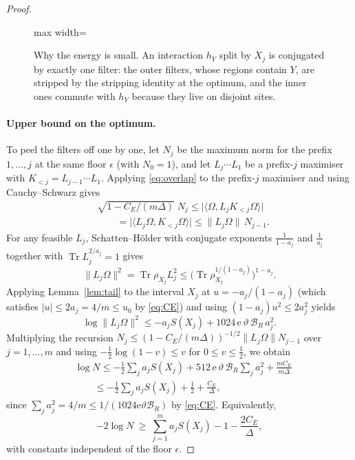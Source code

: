 \documentclass[aps,prx,reprint,superscriptaddress,floatfix,nofootinbib,longbibliography,amsmath,amssymb]{revtex4-2}
\newcommand{\Tr}{\operatorname{Tr}}
\newcommand{\norm}[1]{\lVert #1\rVert}
\newcommand{\abs}[1]{\lvert #1\rvert}
\newcommand{\cB}{\mathcal B}
\newcommand{\Om}{\Omega}
\newcommand{\e}{\mathrm e}
\theoremstyle{plain}
\theoremstyle{definition}
\begin{document}
\begin{proof}
\begin{figure}[t]
\centering
\begin{adjustbox}{max width=\linewidth}

\end{adjustbox}
\caption{Why the energy is small. An interaction $h_Y$ split by $X_j$ is conjugated by exactly one filter: the outer filters, whose regions contain $Y$, are stripped by the stripping identity at the optimum, and the inner ones commute with $h_Y$ because they live on disjoint sites.}\label{fig:qc-single-split}
\end{figure}

\paragraph{Upper bound on the optimum.}
To peel the filters off one by one, let $N_j$ be the maximum norm for the
prefix $1,\dots,j$ at the same floor $\epsilon$ (with $N_0=1$), and let
$L_j\cdots L_1$ be a prefix-$j$ maximiser with $K_{<j}=L_{j-1}\cdots L_1$.
Applying \eqref{eq:overlap} to the prefix-$j$ maximiser and using
Cauchy--Schwarz gives
\[
\begin{split}
 &\sqrt{1-C_E/(m\Delta)}\;N_j\le\abs{\langle\Om,L_jK_{<j}\Om\rangle}\\
 &\qquad=\abs{\langle L_j\Om,K_{<j}\Om\rangle}\le\norm{L_j\Om}\,N_{j-1}.
\end{split}
\]
For any feasible $L_j$, Schatten--Hölder with conjugate exponents
$\frac1{1-a_j}$ and $\frac1{a_j}$ together with $\Tr L_j^{2/a_j}=1$ gives
\[
 \norm{L_j\Om}^2=\Tr\rho_{X_j}L_j^2\le\bigl(\Tr\rho_{X_j}^{1/(1-a_j)}\bigr)^{1-a_j}.
\]
Applying Lemma~\ref{lem:tail} to the interval $X_j$ at
$u=-a_j/(1-a_j)$ (which satisfies $\abs u\le 2a_j=4/m\le u_0$ by
\eqref{eq:CE}) and using $(1-a_j)u^2\le 2a_j^2$ yields
\[
 \log\norm{L_j\Om}^2\le -a_jS(X_j)+1024\,\e\,\vartheta\,\cB_R\,a_j^2 .
\]
Multiplying the recursion $N_j\le(1-C_E/(m\Delta))^{-1/2}\norm{L_j\Om}N_{j-1}$
over $j=1,\dots,m$ and using $-\frac12\log(1-v)\le v$ for $0\le v\le\frac12$,
we obtain
\[
\begin{split}
 &\log N\le-\frac12\sum_ja_jS(X_j)+512\,\e\,\vartheta\,\cB_R\sum_ja_j^2+\frac{mC_E}{m\Delta}\\
 &\qquad\le -\frac12\sum_ja_jS(X_j)+\frac12+\frac{C_E}{\Delta},
\end{split}
\]
since $\sum_ja_j^2=4/m\le 1/(1024\e\vartheta\cB_R)$ by \eqref{eq:CE}. Equivalently,
\begin{equation}\label{eq:lowerN}
 -2\log N\ \ge\ \sum_{j=1}^ma_jS(X_j)-1-\frac{2C_E}{\Delta},
\end{equation}
with constants independent of the floor $\epsilon$.


\end{proof}
\end{document}
